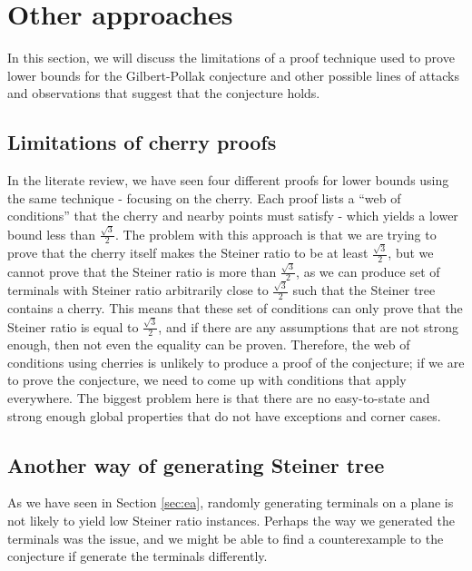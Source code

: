 \documentclass{mpaper}
\begin{document}
\section{Other approaches}
In this section, we will discuss the limitations of a proof technique used to prove lower bounds for the Gilbert-Pollak conjecture and other possible lines of attacks and observations that suggest that the conjecture holds. 
\subsection{Limitations of cherry proofs}

In the literate review, we have seen four different proofs for lower bounds using the same technique - focusing on the cherry. Each proof lists a ``web of conditions'' that the cherry and nearby points must satisfy - which yields a lower bound less than $\frac{\sqrt{3}}{2}$. The problem with this approach is that we are trying to prove that the cherry itself makes the Steiner ratio to be at least $\frac{\sqrt{3}}{2}$, but we cannot prove that the Steiner ratio is more than  $\frac{\sqrt{3}}{2}$, as we can produce set of terminals with Steiner ratio arbitrarily close to $\frac{\sqrt{3}}{2}$ such that the Steiner tree contains a cherry. This means that  these set of conditions can only prove that the Steiner ratio is equal to  $\frac{\sqrt{3}}{2}$, and if there are any assumptions that are not strong enough, then not even the equality can be proven. Therefore, the web of conditions using cherries is unlikely to produce a proof of the conjecture; if we are to prove the conjecture, we need to come up with conditions that apply everywhere. The biggest problem here is that there are no easy-to-state and strong enough global properties that do not have exceptions and corner cases.


\subsection{Another way of generating Steiner tree}
As we have seen in Section \ref{sec:ea}, randomly generating terminals on a plane is not likely to yield low Steiner ratio instances. Perhaps the way we generated the terminals was the issue, and we might be able to find a counterexample to the conjecture if generate the terminals differently.
\end{document}

